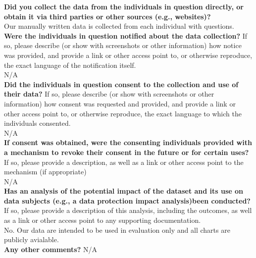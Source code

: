     \textcolor{\sectioncolor}{\textbf{Did you collect the data from the individuals in question directly, or
    obtain it via third parties or other sources (e.g., websites)?
    }
    } \\
    Our manually written data is collected from each individual with questions.\\
    
    \textcolor{\sectioncolor}{\textbf{Were the individuals in question notified about the data collection?
    }
    If so, please describe (or show with screenshots or other information) how
    notice was provided, and provide a link or other access point to, or
    otherwise reproduce, the exact language of the notification itself.
    } \\
    N/A \\
    
    \textcolor{\sectioncolor}{\textbf{Did the individuals in question consent to the collection and use of their
    data?
    }
    If so, please describe (or show with screenshots or other information) how
    consent was requested and provided, and provide a link or other access
    point to, or otherwise reproduce, the exact language to which the
    individuals consented.
    } \\
    N/A \\
    
    \textcolor{\sectioncolor}{\textbf{If consent was obtained, were the consenting individuals provided with a
    mechanism to revoke their consent in the future or for certain uses?
    }
     If so, please provide a description, as well as a link or other access
     point to the mechanism (if appropriate)
    } \\
    N/A \\
    
    \textcolor{\sectioncolor}{\textbf{Has an analysis of the potential impact of the dataset and its use on data
    subjects (e.g., a data protection impact analysis)been conducted?
    }
    If so, please provide a description of this analysis, including the
    outcomes, as well as a link or other access point to any supporting
    documentation.
    } \\
    No. Our data are intended to be used in evaluation only and all charts are publicly avialable.  \\
    
    \textcolor{\sectioncolor}{\textbf{Any other comments?
    }} N/A \\

